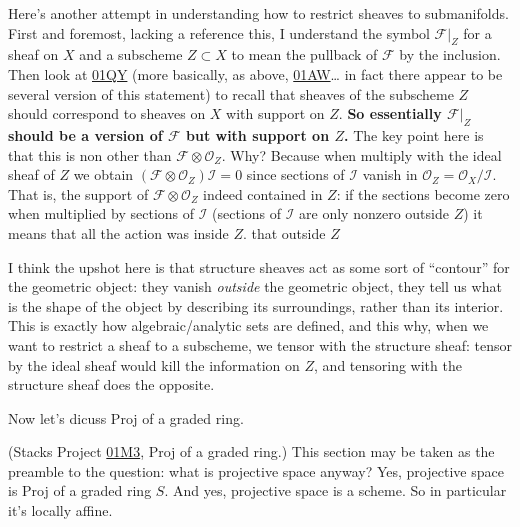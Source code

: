 \documentclass{book}
\begin{document}
\medskip\noindent
Here's another attempt in understanding how
to restrict sheaves to submanifolds.
First and foremost, lacking a reference this,
I understand the symbol $\mathcal{F}|_Z$ for
a sheaf
on $X$ and a subscheme  $Z \subset X$ to mean
the
pullback of $\mathcal{F}$ by the inclusion.
Then look at
\href{https://stacks.math.columbia.edu/tag/%
01QY}{01QY}
(more basically, as above,
\href{https://stacks.math.columbia.edu/tag/%
01AW}{01AW}…
in fact there appear to be several version of
this statement)
to recall that sheaves of the subscheme $Z$
should correspond
to sheaves on $X$ with support on $Z$.
{\bf So essentially $\mathcal{F}|_Z$ should
be a version of $\mathcal{F}$
but with support on $Z$.}
The key point here is that this is non other
than
$\mathcal{F} \otimes \mathcal{O}_Z$.
Why? Because when multiply with the ideal
sheaf of $Z$ we obtain
$(\mathcal{F} \otimes
\mathcal{O}_Z)\mathcal{I}=0$
since sections of $\mathcal{I}$
vanish in
$\mathcal{O}_Z=\mathcal{O}_X/\mathcal{I}$.
That is, the support of $\mathcal{F} \otimes
\mathcal{O}_Z$ indeed
contained in $Z$: if the sections become zero
when
multiplied by sections of $\mathcal{I}$
(sections of $\mathcal{I}$ are only nonzero
outside $Z$)
it means that all the action was inside $Z$.
that outside $Z$

I think the upshot here is that structure
sheaves
act as some sort of ``contour'' for the
geometric object:
they vanish {\it outside} the geometric
object,
they tell us what is the shape of the object
by describing its surroundings, rather than
its interior.
This is exactly how algebraic/analytic sets
are defined,
and this why, when we want to restrict a
sheaf
to a subscheme, we tensor with the structure
sheaf:
tensor by the ideal sheaf would kill the
information on $Z$,
and tensoring with the structure sheaf does
the opposite.














\medskip\noindent
Now let's dicuss Proj of a graded ring.

\noindent
(Stacks Project
\href{https://stacks.math.columbia.edu/tag/%
01M3}{01M3},
Proj of a graded ring.)
This section may be taken as the preamble to
the question: what is projective space
anyway?
Yes, projective space is Proj of a graded
ring $S$.
And yes, projective space is a scheme.
So in particular it's locally affine.
\end{document}
